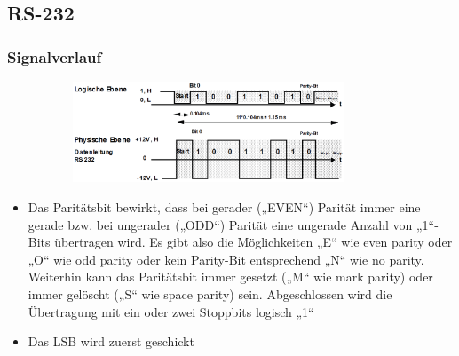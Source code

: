 \subsection{RS-232}
\subsubsection{Signalverlauf}
  \includegraphics[width= 12cm, height=3cm]{pictures/RS2323_Signalverlauf}
  \begin{itemize}
    \item Das Paritätsbit bewirkt, dass bei gerader („EVEN“) Parität immer eine
    gerade bzw. bei ungerader („ODD“) Parität eine ungerade Anzahl von „1“-Bits übertragen wird. Es gibt also die Möglichkeiten „E“ wie even parity oder „O“ wie odd parity oder kein Parity-Bit entsprechend „N“ wie no parity. Weiterhin kann das Paritätsbit immer gesetzt („M“ wie mark parity) oder immer gelöscht („S“ wie space parity) sein. Abgeschlossen wird die Übertragung mit ein oder zwei Stoppbits logisch „1“
    \item Das LSB wird zuerst geschickt
  \end{itemize}
